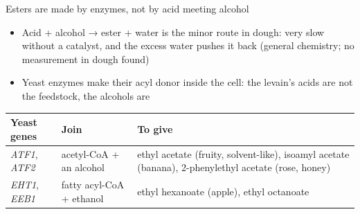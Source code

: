 \documentclass[aspectratio=169,11pt]{beamer}
\newcommand{\muted}[1]{{\color{muted}#1}}
\newcommand{\tablefont}{\footnotesize\renewcommand{\arraystretch}{1.15}}
\begin{document}
\begin{frame}{Esters are made by enzymes, not by acid meeting alcohol}
  \small
  \begin{itemize}\setlength{\itemsep}{0.1em}
    \item Acid + alcohol → ester + water is the minor route in dough: very slow
      without a catalyst, and the excess water pushes it back
      \muted{(general chemistry; no measurement in dough found)}
    \item Yeast enzymes make their acyl donor inside the cell: the levain's
      acids are not the feedstock, the alcohols are
  \end{itemize}
  \smallskip
  \begingroup\tablefont
  \begin{tabularx}{\linewidth}{@{}l l Y@{}}
    \toprule
    \textbf{Yeast genes} & \textbf{Join} & \textbf{To give} \\
    \midrule
    \textit{ATF1}, \textit{ATF2} & acetyl-CoA + an alcohol &
      ethyl acetate (fruity, solvent-like), isoamyl acetate (banana),
      \mbox{2-phenylethyl} acetate (rose, honey) \\
    \textit{EHT1}, \textit{EEB1} & fatty acyl-CoA + ethanol &
      ethyl hexanoate (apple), ethyl octanoate \\
    \bottomrule
  \end{tabularx}\endgroup
\end{frame}
\end{document}
